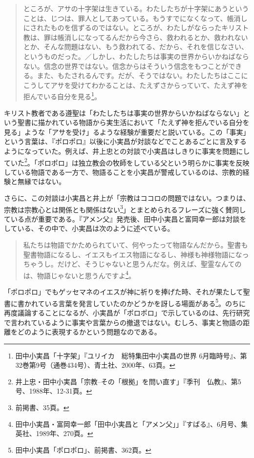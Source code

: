 \begin{quote}
  ところが、アサの十字架は生きている。わたしたちが十字架にあうということは、じつは、罪人としてあっている。もうすでになくなって、帳消しにされたものを信ずるのではない。ところが、わたしがならったキリスト教は、罪は帳消しになってるんだから今さら、救われるとか、救われないとか、そんな問題はない、もう救われてる、だから、それを信じなさい、というものだった。／しかし、わたしたちは事実の世界からいかねばならない。信念の世界ではない。信念からはそういう信念をもつことができる。また、もたされるんです。だが、そうではない。わたしたちはここにこうしてアサを受けてわかることは、たえずさからっていて、たえず神を拒んでいる自分を見る\footnote{田中小実昌「十字架」『ユリイカ　総特集田中小実昌の世界 6月臨時号』、第32巻第9号（通巻434号）、青土社、2000年、63頁。}。
\end{quote}

キリスト教者である遵聖は「わたしたちは事実の世界からいかねばならない」という聖書に描かれている物語から実生活において「たえず神を拒んでいる自分を見る」ような「アサを受け」るような経験が重要だと説いている。この「事実」という言葉は、『ポロポロ』以後に小実昌が対談などでことあるごとに言及するようになっていた。例えば、井上忠との対談で小実昌はしきりに事実を問題にしていた\footnote{井上忠・田中小実昌「宗教--その「根拠」を問い直す」『季刊　仏教』、第5号、1988年、12-31頁。}。「ポロポロ」は独立教会の牧師をしている父という明らかに事実を反映している物語である一方で、物語ることを小実昌が警戒しているのは、宗教的経験と無縁ではない。

さらに、この対談は小実昌と井上が「宗教はココロの問題ではない。つまりは、宗教は宗教心とは関係とも関係はない\footnote{前掲書、35頁。}」とまとめられるフレーズに強く賛同している点が重要である。『アメン父』発売後、田中小実昌と富岡幸一郎は対談をしている、その中で、小実昌は次のように述べている。

\begin{quote}
  私たちは物語でかためられていて、何やったって物語なんだから。聖書も聖書物語になるし、イエスもイエス物語になるし、神様も神様物語になっちゃうし。だけど、そうじゃないと思うんだな。例えば、聖霊なんてのは、物語じゃないと思うんですよ\footnote{田中小実昌・富岡幸一郎「田中小実昌と「アメン父」」『すばる』、6月号、集英社、1989年、270頁。}。
\end{quote}

「ポロポロ」でもゲッセマネのイエスが神に祈りを捧げた時、それが果たして聖書に書かれている言葉を発言していたのかどうかを訝しる場面がある\footnote{田中小実昌「ポロポロ」、前掲書、362頁。}。のちに再度議論することになるが、小実昌が「ポロポロ」で示しているのは、先行研究で言われているように事実や言葉からの撤退ではない。むしろ、事実と物語の距離をどのように表現するかという問題なのである。

